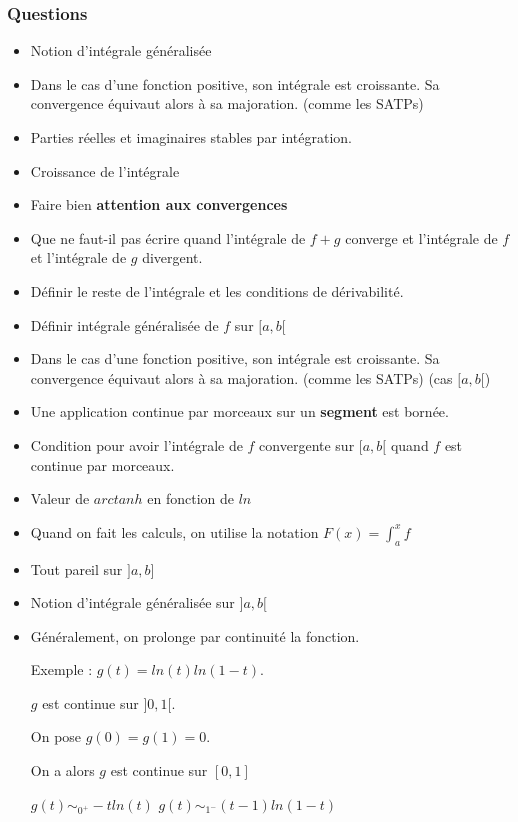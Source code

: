 \documentclass[a4paper, 11pt, hidelinks]{article}
\begin{document}
\subsubsection{Questions}

\begin{itemize}
    \item Notion d'intégrale généralisée
    \item Dans le cas d'une fonction positive, son intégrale est croissante. Sa convergence équivaut alors à sa majoration. (comme les SATPs)
    \item Parties réelles et imaginaires stables par intégration.
    \item Croissance de l'intégrale
    \item Faire bien \textbf{attention aux convergences}
    \item Que ne faut-il pas écrire quand l'intégrale de $f+g$ converge et l'intégrale de $f$ et l'intégrale de $g$ divergent.
    \item Définir le reste de l'intégrale et les conditions de dérivabilité.
    \item Définir intégrale généralisée de $f$ sur $[a,b[$
    \item Dans le cas d'une fonction positive, son intégrale est croissante. Sa convergence équivaut alors à sa majoration. (comme les SATPs) (cas $[a,b[$)
    \item Une application continue par morceaux sur un \textbf{segment} est bornée.
    \item Condition pour avoir l'intégrale de $f$ convergente sur $[a,b[$ quand $f$ est continue par morceaux.
    \item Valeur de $arctanh$ en fonction de $ln$
    \item Quand on fait les calculs, on utilise la notation $F(x)=\displaystyle\int_a^x f$ 
    \item Tout pareil sur $]a,b]$
    \item Notion d'intégrale généralisée sur $]a,b[$
    \item Généralement, on prolonge par continuité la fonction.
    
    Exemple : $g(t)=ln(t)ln(1-t)$. 
    
    $g$ est continue sur $]0,1[$.

    On pose $g(0)=g(1)=0$.

    On a alors $g$ est continue sur $[0,1]$

    $g(t)\sim_{0^+} -tln(t)$     $g(t)\sim_{1^-} (t-1)ln(1-t)$


\end{itemize}
\end{document}
